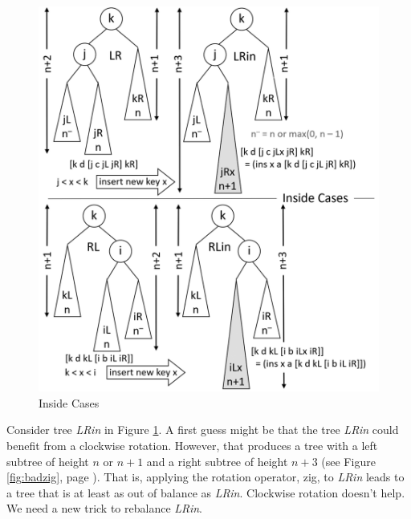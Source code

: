 \begin{figure}
\begin{center}
\includegraphics[scale=1]{images-cmyk/inside-cases}
\end{center}
\caption{Inside Cases}
\label{fig:inside-cases}
\end{figure}

Consider tree \emph{LRin} in
Figure \ref{fig:inside-cases}.
A first guess might be that the tree \emph{LRin}
could benefit from a clockwise rotation.
However, that produces a tree with a left subtree of height $n$ or $n+1$
and a right subtree of height $n+3$
(see Figure \ref{fig:badzig}, page \pageref{fig:badzig}).
That is, applying the rotation operator, \textsf{zig}, to \emph{LRin}
leads to a tree that is at least as out of balance as \emph{LRin}.
Clockwise rotation doesn't help.
We need a new trick to rebalance \emph{LRin}.

